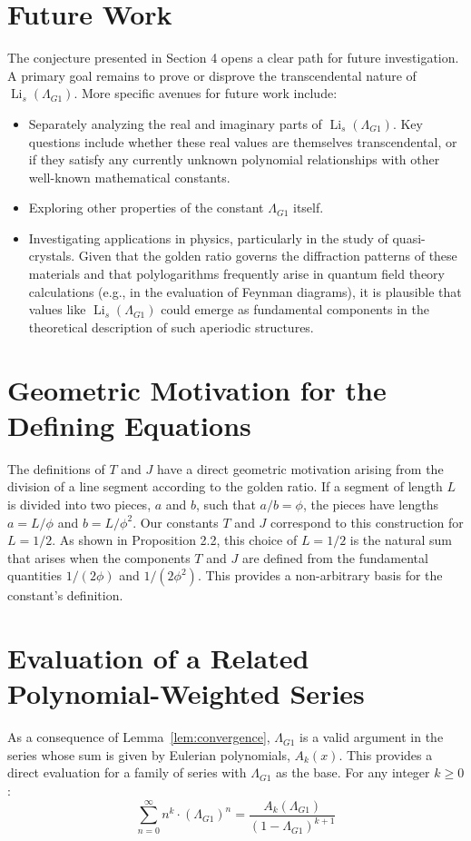 \documentclass{amsart}
\theoremstyle{plain}
\theoremstyle{definition}
\theoremstyle{remark}
\DeclareMathOperator{\Li}{Li} %
\newcommand{\LambdaG}{\Lambda_{G1}}
\begin{document}
\section{Future Work}
The conjecture presented in Section 4 opens a clear path for future investigation. A primary goal remains to prove or disprove the transcendental nature of $\Li_s(\LambdaG)$. More specific avenues for future work include:
\begin{itemize}
    \item Separately analyzing the real and imaginary parts of $\Li_s(\LambdaG)$. Key questions include whether these real values are themselves transcendental, or if they satisfy any currently unknown polynomial relationships with other well-known mathematical constants.
    \item Exploring other properties of the constant $\LambdaG$ itself.
    \item Investigating applications in physics, particularly in the study of quasi-crystals. Given that the golden ratio governs the diffraction patterns of these materials and that polylogarithms frequently arise in quantum field theory calculations (e.g., in the evaluation of Feynman diagrams), it is plausible that values like $\Li_s(\LambdaG)$ could emerge as fundamental components in the theoretical description of such aperiodic structures.
\end{itemize}

\appendix
\section{Geometric Motivation for the Defining Equations}
The definitions of $T$ and $J$ have a direct geometric motivation arising from the division of a line segment according to the golden ratio. If a segment of length $L$ is divided into two pieces, $a$ and $b$, such that $a/b = \phi$, the pieces have lengths $a=L/\phi$ and $b=L/\phi^2$. Our constants $T$ and $J$ correspond to this construction for $L=1/2$. As shown in Proposition 2.2, this choice of $L=1/2$ is the natural sum that arises when the components $T$ and $J$ are defined from the fundamental quantities $1/(2\phi)$ and $1/(2\phi^2)$. This provides a non-arbitrary basis for the constant's definition.

\section{Evaluation of a Related Polynomial-Weighted Series}
As a consequence of Lemma~\ref{lem:convergence}, $\LambdaG$ is a valid argument in the series whose sum is given by Eulerian polynomials, $A_k(x)$. This provides a direct evaluation for a family of series with $\LambdaG$ as the base. For any integer $k \ge 0$:
$$ \sum_{n=0}^{\infty} n^k \cdot (\LambdaG)^n = \frac{A_k(\LambdaG)}{(1-\LambdaG)^{k+1}} $$
\end{document}
